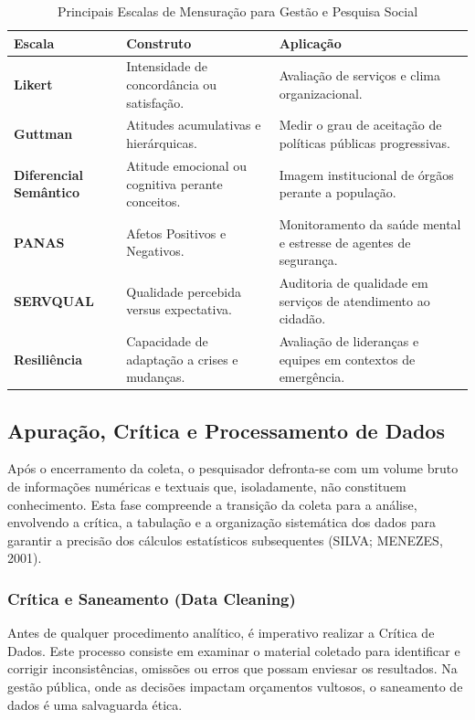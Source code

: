 \begin{table}[H]
\centering
\caption{Principais Escalas de Mensuração para Gestão e Pesquisa Social}
\label{tab:escalas_famosas}
\small
\begin{tabular}{l|p{5cm}|p{4cm}}
\hline
\textbf{Escala} & \textbf{Construto} & \textbf{Aplicação} \\ \hline
\textbf{Likert} & Intensidade de concordância ou satisfação. & Avaliação de serviços e clima organizacional. \\  \hline
\textbf{Guttman} & Atitudes acumulativas e hierárquicas. & Medir o grau de aceitação de políticas públicas progressivas. \\  \hline
\textbf{Diferencial Semântico} & Atitude emocional ou cognitiva perante conceitos. & Imagem institucional de órgãos perante a população. \\  \hline
\textbf{PANAS} & Afetos Positivos e Negativos. & Monitoramento da saúde mental e estresse de agentes de segurança. \\  \hline
\textbf{SERVQUAL} & Qualidade percebida versus expectativa. & Auditoria de qualidade em serviços de atendimento ao cidadão. \\  \hline
\textbf{Resiliência} & Capacidade de adaptação a crises e mudanças. & Avaliação de lideranças e equipes em contextos de emergência. \\  \hline
\end{tabular}
\end{table}

\subsection{Apuração, Crítica e Processamento de Dados}

Após o encerramento da coleta, o pesquisador defronta-se com um volume bruto de informações numéricas e textuais que, isoladamente, não constituem conhecimento. Esta fase compreende a transição da coleta para a análise, envolvendo a crítica, a tabulação e a organização sistemática dos dados para garantir a precisão dos cálculos estatísticos subsequentes (SILVA; MENEZES, 2001).

\subsubsection{Crítica e Saneamento (Data Cleaning)}

Antes de qualquer procedimento analítico, é imperativo realizar a Crítica de Dados. Este processo consiste em examinar o material coletado para identificar e corrigir inconsistências, omissões ou erros que possam enviesar os resultados. Na gestão pública, onde as decisões impactam orçamentos vultosos, o saneamento de dados é uma salvaguarda ética. \vskip0.3cm

